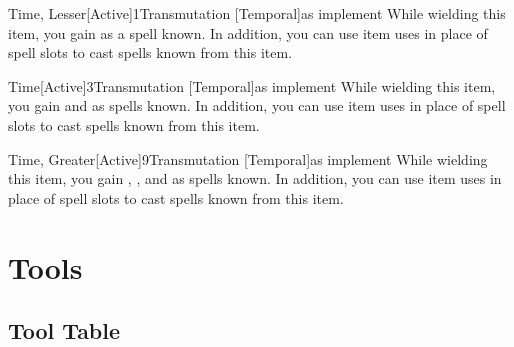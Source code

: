         \begin{magicitemdef}[Arcane]{Time, Lesser}[Active]{1}{Transmutation [Temporal]}{as implement}
             While wielding this item, you gain  as a spell known.
            In addition, you can use item uses in place of spell slots to cast spells known from this item.
        \end{magicitemdef}

        \begin{magicitemdef}[Arcane]{Time}[Active]{3}{Transmutation [Temporal]}{as implement}
             While wielding this item, you gain  and  as spells known.
            In addition, you can use item uses in place of spell slots to cast spells known from this item.
        \end{magicitemdef}

        \begin{magicitemdef}[Arcane]{Time, Greater}[Active]{9}{Transmutation [Temporal]}{as implement}
             While wielding this item, you gain , , and  as spells known.
            In addition, you can use item uses in place of spell slots to cast spells known from this item.
        \end{magicitemdef}

\section{Tools}

    \onecolumn
    \subsection{Tool Table}

